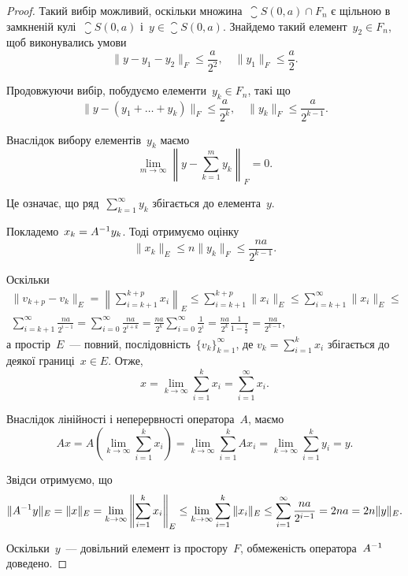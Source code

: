 \begin{proof}
Такий вибір можливий, оскільки множина~$\closure S(0, a) \cap F_n$ є
щільною в замкненій кулі~$\closure S(0, a)$ і~$y \in \closure S(0, a)$. Знайдемо
такий елемент~$y_2 \in F_n$, щоб виконувались умови
\begin{equation*}
    \|y - y_1 - y_2\|_F \le \frac{a}{2^2}, \quad \|y_1\|_F \le \frac{a}{2}.
\end{equation*}

Продовжуючи вибір, побудуємо елементи~$y_k \in F_n$, такі що
\begin{equation*}
    \|y - (y_1 + \dots + y_k)\|_F \le \frac{a}{2^k}, \quad \|y_k\|_F \le \frac{a}{2^{k - 1}}.
\end{equation*}

Внаслідок вибору елементів~$y_k$ маємо
\begin{equation*}
    \lim_{m \to \infty} \left\| y - \sum_{k = 1}^m y_k \right\|_F = 0.
\end{equation*}

Це означає, що ряд~$\sum_{k = 1}^\infty y_k$ збігається до елемента~$y$.

Покладемо~$x_k = A^{-1} y_k$. Тоді отримуємо оцінку
\begin{equation*}
    \|x_k\|_E \le n \|y_k\|_F \le \frac{n a}{2^{k - 1}}.
\end{equation*}

Оскільки
\begin{multline*}
    \|v_{k + p} - v_k\|_E =
    \left\| \sum_{i = k + 1}^{k + p} x_i \right\|_E \le
    \sum_{i = k + 1}^{k + p} \|x_i\|_E \le
    \sum_{i = k + 1}^\infty \|x_i\|_E \le \\
    \sum_{i = k + 1}^\infty \frac{n a}{2^{i - 1}} =
    \sum_{i = 0}^\infty \frac{n a}{2^{i + k}} =
    \frac{n a}{2^k} \sum_{i = 0}^\infty \frac{1}{2^i} =
    \frac{n a}{2^k} \frac{1}{1 - \tfrac{1}{2}} =
    \frac{n a}{2^{k - 1}},
\end{multline*}
а простір~$E$~--- повний, послідовність~$\{v_k\}_{k = 1}^\infty$, де
$v_k = \sum_{i = 1}^k x_i$ збігається до деякої границі~$x \in E$. Отже,
\begin{equation*}
    x = \lim_{k \to \infty} \sum_{i = 1}^k x_i = \sum_{i = 1}^\infty x_i.
\end{equation*}

Внаслідок лінійності і неперервності оператора~$A$, маємо
\begin{equation*}
    A x =
    A \left( \lim_{k \to \infty} \sum_{i = 1}^k x_i \right) =
    \lim_{k \to \infty} \sum_{i = 1}^k A x_i =
    \lim_{k \to \infty} \sum_{i = 1}^k y_i = y.
\end{equation*}

Звідси отримуємо, що
\begin{equation*}
    \|A^{-1} y\|_E = \|x\|_E =
    \lim_{k \to \infty} \left\| \sum_{i = 1}^k x_i \right\|_E \le
    \lim_{k \to \infty} \sum_{i = 1}^k \|x_i\|_E \le
    \sum_{i = 1}^\infty \frac{n a}{2^{i - 1}} =
    2 n a = 2 n \|y\|_E.
\end{equation*}
 
Оскільки~$y$~--- довільний елемент із простору~$F$,
обмеженість оператора~$A^{-1}$ доведено. 
\end{proof}

